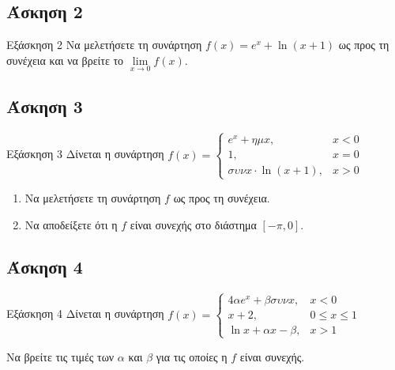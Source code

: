 \documentclass[greek]{beamer}
\begin{document}
\subsection{Άσκηση 2}
\begin{frame}[label=Άσκηση2]{Εξάσκηση 2}
        Να μελετήσετε τη συνάρτηση $f(x)=e^x+\ln (x+1)$ ως προς τη συνέχεια και να βρείτε το $\lim\limits_{x \to 0}{ f(x) }$.


\end{frame}

\subsection{Άσκηση 3}
\begin{frame}[label=Άσκηση3]{Εξάσκηση 3}
        Δίνεται η συνάρτηση $f(x)=\begin{cases}
                        e^x+ημx,             & x<0 \\
                        1,                   & x=0 \\
                        συνx\cdot \ln (x+1), & x>0
                \end{cases}$
        \begin{enumerate}
                \item Να μελετήσετε τη συνάρτηση $f$ ως προς τη συνέχεια.
                \item Να αποδείξετε ότι η $f$ είναι συνεχής στο διάστημα $[-π,0]$.
        \end{enumerate}

\end{frame}


\subsection{Άσκηση 4}
\begin{frame}[label=Άσκηση4]{Εξάσκηση 4}
        Δίνεται η συνάρτηση $f(x)=\begin{cases}
                        4αe^x+βσυνx, & x<0         \\
                        x+2,         & 0\le x\le 1 \\
                        \ln x+αx-β,  & x>1
                \end{cases}$

        Να βρείτε τις τιμές των $α$ και $β$ για τις οποίες η $f$ είναι συνεχής.

\end{frame}
\end{document}
